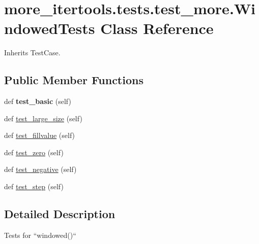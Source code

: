 \hypertarget{classmore__itertools_1_1tests_1_1test__more_1_1_windowed_tests}{}\section{more\+\_\+itertools.\+tests.\+test\+\_\+more.\+Windowed\+Tests Class Reference}
\label{classmore__itertools_1_1tests_1_1test__more_1_1_windowed_tests}


Inherits Test\+Case.

\subsection*{Public Member Functions}
\begin{DoxyCompactItemize}
\item 
\mbox{\label{classmore__itertools_1_1tests_1_1test__more_1_1_windowed_tests_a4201ca4d9c99eff3f4c76c3f7a3e7143}} 
def {\bfseries test\+\_\+basic} (self)
\item 
def \hyperlink{classmore__itertools_1_1tests_1_1test__more_1_1_windowed_tests_ad5646f20fc284212c7a901cc753bbfab}{test\+\_\+large\+\_\+size} (self)
\item 
def \hyperlink{classmore__itertools_1_1tests_1_1test__more_1_1_windowed_tests_a1e9f091a3454dc73ecf3642e31914616}{test\+\_\+fillvalue} (self)
\item 
def \hyperlink{classmore__itertools_1_1tests_1_1test__more_1_1_windowed_tests_a7d6b87aa34de99502c79a325d6cfbfe3}{test\+\_\+zero} (self)
\item 
def \hyperlink{classmore__itertools_1_1tests_1_1test__more_1_1_windowed_tests_a6ce008336dfa4f909a2a9528e6b017ac}{test\+\_\+negative} (self)
\item 
def \hyperlink{classmore__itertools_1_1tests_1_1test__more_1_1_windowed_tests_a2b640196500531a6c48db2f1751afad9}{test\+\_\+step} (self)
\end{DoxyCompactItemize}


\subsection{Detailed Description}
\begin{DoxyVerb}Tests for ``windowed()``\end{DoxyVerb}
 

